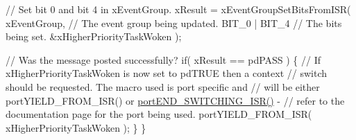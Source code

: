 \begin{DoxyPre}    // Set bit 0 and bit 4 in xEventGroup.
    xResult = xEventGroupSetBitsFromISR(
                        xEventGroup,    // The event group being updated.
                        BIT\_0 | BIT\_4   // The bits being set.
                        \&xHigherPriorityTaskWoken );\end{DoxyPre}



\begin{DoxyPre}    // Was the message posted successfully?
    if( xResult == pdPASS )
    \{
        // If xHigherPriorityTaskWoken is now set to pdTRUE then a context
        // switch should be requested.  The macro used is port specific and
        // will be either portYIELD\_FROM\_ISR() or \hyperlink{portmacro_8h_a63b994040c62c9685490a71c87a13d8a}{portEND\_SWITCHING\_ISR()} -
        // refer to the documentation page for the port being used.
        portYIELD\_FROM\_ISR( xHigherPriorityTaskWoken );
    \}
 \}
  \end{DoxyPre}
 